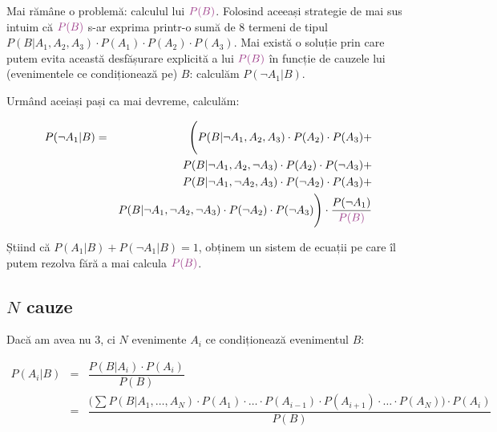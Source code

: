 \documentclass[12pt]{article}
\begin{document}
Mai rămâne o problemă: calculul lui
${\color{DarkOrchid}P(B)}$. Folosind aceeași strategie de mai sus
intuim că ${\color{DarkOrchid}P(B)}$ s-ar exprima printr-o sumă de 8
termeni de tipul $P(B \vert A_1, A_2, A_3) \cdot P(A_1) \cdot P(A_2)
\cdot P(A_3)$. Mai există o soluție prin care putem evita această
desfășurare explicită a lui ${\color{DarkOrchid}P(B)}$ în funcție de
cauzele lui (evenimentele ce condiționează pe) $B$: calculăm $P(\neg
A_1 | B)$.

Urmând aceiași pași ca mai devreme, calculăm:

\begin{eqnarray*}
  P(\neg A_1 | B)   & = & \Bigg(P(B \vert \neg A_1, A_2, A_3) \cdot P(A_2) \cdot P(A_3) + \\
  &  & P(B \vert \neg A_1, A_2, \neg A_3) \cdot P(A_2) \cdot P(\neg A_3) + \\
  &  & P(B \vert \neg A_1, \neg A_2, A_3) \cdot P(\neg A_2) \cdot P(A_3) + \\
  &  & P(B \vert \neg A_1, \neg A_2, \neg A_3) \cdot P(\neg A_2) \cdot P(\neg A_3)\Bigg) \cdot \dfrac{P(\neg A_1)}{{\color{DarkOrchid}P(B)}}
\end{eqnarray*}

Știind că $P(A_1 \vert B) + P(\neg A_1 \vert B) = 1$, obținem un
sistem de ecuații pe care îl putem rezolva fără a mai calcula
${\color{DarkOrchid}P(B)}$.

\subsection{$N$ cauze}
\label{sec:n_causes}

Dacă am avea nu 3, ci $N$ evenimente $A_i$ ce condiționează
evenimentul $B$:

\begin{eqnarray*}
  P(A_i \vert B) & = &\dfrac{P(B \vert A_i) \cdot P(A_i)}{P(B)} \\
  & = & \dfrac{\Big(\displaystyle\sum P(B \vert A_1, \ldots, A_N) \cdot P(A_1)\cdot \ldots \cdot P(A_{i-1}) \cdot P(A_{i+1}) \cdot \ldots \cdot P(A_N) \Big) \cdot P(A_i)}{P(B)}
\end{eqnarray*}
\end{document}
